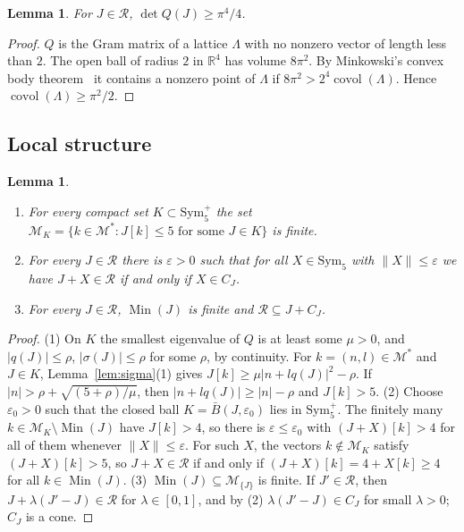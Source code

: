 \documentclass[11pt]{amsart}
\newtheorem{lemma}[theorem]{Lemma}
\theoremstyle{definition}
\theoremstyle{remark}
\numberwithin{equation}{section}
\numberwithin{table}{section}
\numberwithin{figure}{section}
\newcommand{\R}{\mathbb{R}}
\newcommand{\M}{\mathcal{M}}
\newcommand{\Rk}{\mathcal{R}}
\newcommand{\Sym}{\mathrm{Sym}}
\newcommand{\Min}{\operatorname{Min}}
\newcommand{\covol}{\operatorname{covol}}
\begin{document}
\begin{lemma}\label{lem:minkowski}
For $J\in\Rk$, $\det Q(J)\ge\pi^4/4$.
\end{lemma}

\begin{proof}
$Q$ is the Gram matrix of a lattice $\Lambda$ with no nonzero vector of length less than $2$. The open ball of radius $2$ in $\R^4$ has volume $8\pi^2$. By Minkowski's convex body theorem~\cite[Ch.~III]{Cassels1959} it contains a nonzero point of $\Lambda$ if $8\pi^2>2^4\covol(\Lambda)$. Hence $\covol(\Lambda)\ge\pi^2/2$.
\end{proof}

\subsection{Local structure}

\begin{lemma}\label{lem:local}
\begin{enumerate}
\item For every compact set $K\subset\Sym_5^+$ the set $\M_K=\{k\in\M^*: J[k]\le5\text{ for some }J\in K\}$ is finite.
\item For every $J\in\Rk$ there is $\varepsilon>0$ such that for all $X\in\Sym_5$ with $\|X\|\le\varepsilon$ we have $J+X\in\Rk$ if and only if $X\in C_J$.
\item For every $J\in\Rk$, $\Min(J)$ is finite and $\Rk\subseteq J+C_J$.
\end{enumerate}
\end{lemma}

\begin{proof}
(1) On $K$ the smallest eigenvalue of $Q$ is at least some $\mu>0$, and $|q(J)|\le\rho$, $|\sigma(J)|\le\rho$ for some $\rho$, by continuity. For $k=(n,l)\in\M^*$ and $J\in K$, Lemma~\ref{lem:sigma}(1) gives $J[k]\ge\mu|n+lq(J)|^2-\rho$. If $|n|>\rho+\sqrt{(5+\rho)/\mu}$, then $|n+lq(J)|\ge|n|-\rho$ and $J[k]>5$.
(2) Choose $\varepsilon_0>0$ such that the closed ball $K=\bar B(J,\varepsilon_0)$ lies in $\Sym_5^+$. The finitely many $k\in\M_K\setminus\Min(J)$ have $J[k]>4$, so there is $\varepsilon\le\varepsilon_0$ with $(J+X)[k]>4$ for all of them whenever $\|X\|\le\varepsilon$. For such $X$, the vectors $k\notin\M_K$ satisfy $(J+X)[k]>5$, so $J+X\in\Rk$ if and only if $(J+X)[k]=4+X[k]\ge4$ for all $k\in\Min(J)$.
(3) $\Min(J)\subseteq\M_{\{J\}}$ is finite. If $J'\in\Rk$, then $J+\lambda(J'-J)\in\Rk$ for $\lambda\in[0,1]$, and by (2) $\lambda(J'-J)\in C_J$ for small $\lambda>0$; $C_J$ is a cone.
\end{proof}
\end{document}

